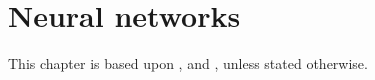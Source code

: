 \chapter{Neural networks}\label{Ch.3}
This chapter is based upon \citep[Ch. 10]{SL-ISLR}, \citep[Ch. 1]{NN} and \citep[Ch. 2]{NNDL}, unless stated otherwise.



